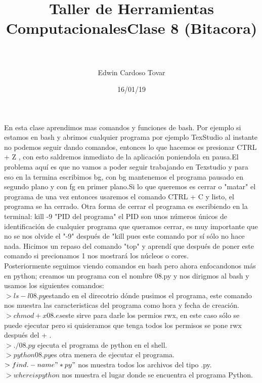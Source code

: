 \documentclass[letterpaper, 12pt, oneside]{article}%
\title{\Huge Taller de Herramientas Computacionales}
\author{Edwin Cardoso Tovar}%
\date{16/01/19}%
\begin{document}
	\maketitle
	\begin{center}%
	\end{center}%
	\newpage%
	
	\title{\textbf{\Huge Clase 8 (Bitacora)\\} \\}%
	
	En esta clase aprendimos mas comandos y funciones de bash. Por ejemplo si estamos en bash y abrimos cualquier programa por ejemplo TexStudio al instante no podemos seguir dando comandos, entonces lo que hacemos es presionar CTRL + Z , con esto saldremos inmediato de la aplicación poniendola en pausa.El problema aquí es que no vamos a poder seguir trabajando en Texstudio  y para eso en la termina escribimos bg, con bg mantenemos el programa pausado en segundo plano y con fg en primer plano.Si lo que queremos es cerrar o "matar" el programa de una vez entonces usaremos el comando CTRL + C y listo, el programa se ha cerrado.
	Otra forma de cerrar el programa es escribiendo en la terminal: kill -9 "PID del programa" el PID son unos números únicos de identificación de cualquier programa que queramos cerrar, es muy importante que no se nos olvide el "-9" después de "kill  pues este comando por sí sólo no hace nada.
	Hicimos un repaso del comando "top" y aprendí que después de poner este comando si precionamos 1 nos mostrará los núcleos o cores.\\
	
	Posteriormente  seguimos viendo comandos en bash pero ahora  enfocandonos más en python; creamos un programa con el nombre 08.py y nos dirigmos al bash y usamos los siguientes comandos:\\
	$ >ls -l 08.py$estando en el direcotrio dónde pusimos el programa, este comando nos muestra las caracteristicas del programa como hora y fecha de creación.\\
	$>chmod +x 08.es$este sirve para darle los permios rwx, en este caso sólo se puede ejecutar pero si quisieramos que tenga todos los permisos se pone rwx después del + .\\
	$> ./08.py$ ejecuta el programa de python en el shell.\\
	$> python 08.py $es otra menera de ejecutar el programa.\\
	$> find . -name "*py"$ nos muestra todos los archivos del tipo .py.\\
	$> whereis python$ nos muestra el lugar donde se encuentra el programa Python.\\
	
\end{document}
